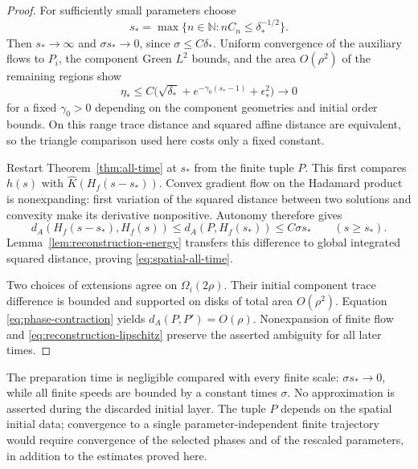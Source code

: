 \begin{proof}
For sufficiently small parameters choose
\begin{equation}\label{eq:preparation-time}
 s_*=\max\{n\in\mathbb N:nC_n\le\delta_*^{-1/2}\}.
\end{equation}
Then $s_*\to\infty$ and $\sigma s_*\to0$, since
$\sigma\le C\delta_*$. Uniform convergence of the auxiliary
flows to $P_i$, the component Green $L^2$ bounds, and the
area $O(\rho^2)$ of the remaining regions show
\begin{equation}\label{eq:quantitative-entry}
 \eta_*\le C\bigl(\sqrt{\delta_*}
                +e^{-\gamma_0(s_*-1)}+\epsilon_*^2\bigr)
                   \longrightarrow0
\end{equation}
for a fixed $\gamma_0>0$ depending on the component
geometries and initial order bounds. On this range trace
distance and squared affine distance are equivalent, so the
triangle comparison used here costs only a fixed constant.

Restart Theorem~\ref{thm:all-time} at $s_*$ from the finite
tuple $P$. This first compares $h(s)$ with
$\widehat K(H_f(s-s_*))$. Convex gradient flow on the
Hadamard product is nonexpanding: first variation of the
squared distance between two solutions and convexity make
its derivative nonpositive. Autonomy therefore gives
\[
 d_A(H_f(s-s_*),H_f(s))
       \le d_A(P,H_f(s_*))\le C\sigma s_*
       \qquad(s\ge s_*).
\]
Lemma~\ref{lem:reconstruction-energy} transfers this
difference to global integrated squared distance, proving
\eqref{eq:spatial-all-time}.

Two choices of extensions agree on $\Omega_i(2\rho)$.
Their initial component trace difference is bounded and
supported on disks of total area $O(\rho^2)$.
Equation \eqref{eq:phase-contraction} yields
$d_A(P,P')=O(\rho)$. Nonexpansion of finite flow and
\eqref{eq:reconstruction-lipschitz} preserve the asserted
ambiguity for all later times.
\end{proof}

The preparation time is negligible compared with every finite
scale: $\sigma s_*\to0$, while all finite speeds are bounded
by a constant times $\sigma$. No approximation is asserted
during the discarded initial layer. The tuple $P$ depends on
the spatial initial data; convergence to a single
parameter-independent finite trajectory would require
convergence of the selected phases and of the rescaled
parameters, in addition to the estimates proved here.

